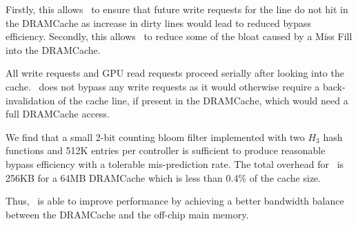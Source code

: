 Firstly, this allows \bypassname\ to ensure that future write requests for the line do not hit in the DRAMCache as increase in dirty lines would lead to reduced bypass efficiency. 
Secondly, this allows \bypassname\ to reduce some of the bloat caused by a Miss Fill \cite{bear} into the DRAMCache.
\par All write requests and GPU read requests proceed serially after looking into the cache. \bypassname\ does not bypass any write requests as it would otherwise require a back-invalidation of the cache line, if present in the DRAMCache, which would need a full DRAMCache access.
\par We find that a small 2-bit counting bloom filter implemented with two $H_3$ hash functions \cite{h3} and 512K entries per controller is sufficient 
to produce reasonable bypass efficiency with a tolerable mis-prediction rate. The total overhead for \bypassname\ is 256KB for a 64MB DRAMCache which is less than 0.4\% of the cache size.
\par Thus, \bypassname\ is able to improve performance by achieving a better bandwidth balance between the DRAMCache and the off-chip main memory.


